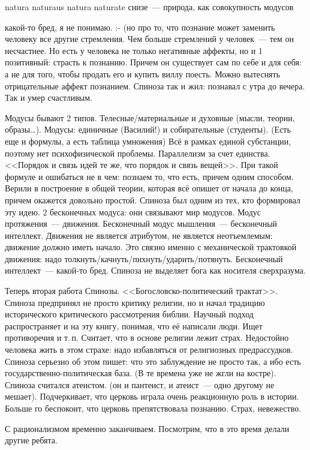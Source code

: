 natura naturaus
natura naturate снизе~--- природа, как совокупность модусов

какой-то бред, я не понимаю. :- (но про то, что познание может заменить человеку все другие стремления.
Чем больше стремлений у человек~--- тем он несчастнее. Но есть у человека не только негативные аффекты, но и 1 позитивный: страсть к познанию. Причем он существует сам по себе и для себя: а не для того, чтобы продать его и купить виллу поесть. Можно вытеснять отрицательные аффект познанием. Спиноза так и жил: познавал с утра до вечера. Так и умер счастливым.

Модусы бывают 2 типов. Телесные/материальные и духовные (мысли, теории, образы\ldots). Модусы: единичные (Василий!) и собирательные (студенты). (Есть еще и формулы, а есть таблица умножения) 
Всё в рамках единой субстанции, поэтому нет психофизической проблемы. Параллелизм за счет единства. <<Порядок и связь идей те же, что порядок и связь вещей>>. При такой формуле и ошибаться не в чем: познаем то, что есть, причем одним способом. Верили в построение в общей теории, которая всё опишет от начала до конца, причем окажется довольно простой. Спиноза был одним из тех, кто формировал эту идею.
2 бесконечных модуса: они связывают мир модусов. Модус протяжения~--- движения. Бесконечный модус мышления~--- бесконечный интеллект. Движения не является атрибутом, не является неотъемлемым: движение должно иметь начало. Это связно именно с механической трактовкой движения: надо толкнуть/качнуть/пихнуть/ударить/потянуть.
Бесконечный интеллект~--- какой-то бред. Спиноза не выделяет бога как носителя сверхразума.

Теперь вторая работа Спинозы. <<Богословско-политический трактат>>. Спиноза предпринял не просто критику религии, но и начал традицию исторического критического рассмотрения библии. Научный подход распространяет и на эту книгу, понимая, что её написали люди. Ищет противоречия и т.\,п. Считает, что в основе религии лежит страх. Недостойно человека жить в этом страхе: надо избавляться от религиозных предрассудков. Спиноза серьезно об этом пишет: что это заблуждение не просто так, а ибо есть государственно-политическая база. (В те времена уже не жгли на костре). Спиноза считался атеистом. (он и пантеист, и атеист~--- одно другому не мешает). Подчеркивает, что церковь играла очень реакционную роль в истории. Больше го беспокоит, что церковь препятствовала познанию. Страх, невежество.

С рационализмом временно заканчиваем. Посмотрим, что в это время делали другие ребята.